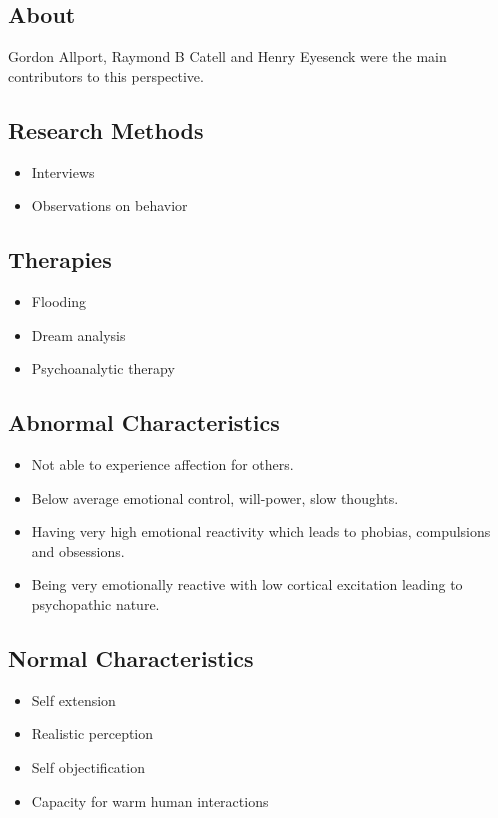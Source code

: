 \documentclass{article}
\begin{document}
		\subsection{About}
			Gordon Allport, Raymond B Catell and Henry Eyesenck were the main contributors to this perspective.
		\subsection{Research Methods}
			\begin{itemize}
				\item Interviews
				\item Observations on behavior
			\end{itemize}
		\subsection{Therapies}
			\begin{itemize}
				\item Flooding
				\item Dream analysis
				\item Psychoanalytic therapy
			\end{itemize}
		\subsection{Abnormal Characteristics}
			\begin{itemize}
				\item Not able to experience affection for others.
				\item Below average emotional control, will-power, slow thoughts.
				\item Having very high emotional reactivity which leads to phobias, compulsions and obsessions.
				\item Being very emotionally reactive with low cortical excitation leading to psychopathic nature.
			\end{itemize}
		\subsection{Normal Characteristics}
			\begin{itemize}
				\item Self extension
				\item Realistic perception
				\item Self objectification
				\item Capacity for warm human interactions
			\end{itemize}
\end{document}
